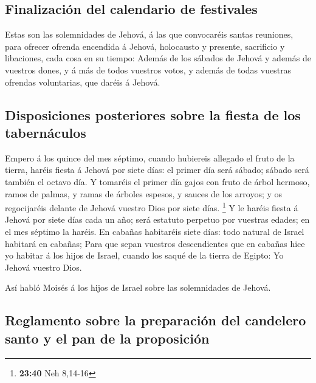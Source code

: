\hypertarget{finalizaciuxf3n-del-calendario-de-festivales}{%
\subsection{Finalización del calendario de
festivales}\label{finalizaciuxf3n-del-calendario-de-festivales}}

 Estas son las solemnidades de Jehová, á las que
convocaréis santas reuniones, para ofrecer ofrenda encendida á Jehová,
holocausto y presente, sacrificio y libaciones, cada cosa en su tiempo:
 Además de los sábados de Jehová y además de vuestros
dones, y á más de todos vuestros votos, y además de todas vuestras
ofrendas voluntarias, que daréis á Jehová.

\hypertarget{disposiciones-posteriores-sobre-la-fiesta-de-los-tabernuxe1culos}{%
\subsection{Disposiciones posteriores sobre la fiesta de los
tabernáculos}\label{disposiciones-posteriores-sobre-la-fiesta-de-los-tabernuxe1culos}}

 Empero á los quince del mes séptimo, cuando hubiereis
allegado el fruto de la tierra, haréis fiesta á Jehová por siete días:
el primer día será sábado; sábado será también el octavo día.
 Y tomaréis el primer día gajos con fruto de árbol
hermoso, ramos de palmas, y ramas de árboles espesos, y sauces de los
arroyos; y os regocijaréis delante de Jehová vuestro Dios por siete
días. \footnote{\textbf{23:40} Neh 8,14-16}  Y le haréis
fiesta á Jehová por siete días cada un año; será estatuto perpetuo por
vuestras edades; en el mes séptimo la haréis.  En cabañas
habitaréis siete días: todo natural de Israel habitará en cabañas;
 Para que sepan vuestros descendientes que en cabañas
hice yo habitar á los hijos de Israel, cuando los saqué de la tierra de
Egipto: Yo Jehová vuestro Dios.

 Así habló Moisés á los hijos de Israel sobre las
solemnidades de Jehová.

\hypertarget{reglamento-sobre-la-preparaciuxf3n-del-candelero-santo-y-el-pan-de-la-proposiciuxf3n}{%
\subsection{Reglamento sobre la preparación del candelero santo y el pan
de la
proposición}\label{reglamento-sobre-la-preparaciuxf3n-del-candelero-santo-y-el-pan-de-la-proposiciuxf3n}}

